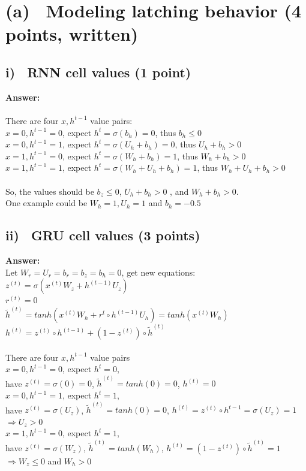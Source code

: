 \documentclass[fleqn]{MJD}
\newcommand{\subproblem}[2]{\section{(#1)~ #2}}
\newcommand{\subsubproblem}[2]{\subsection{ #1)~ #2}}
\newcommand{\0}{\emptyset}
\begin{document}
\subproblem{a}{ Modeling latching behavior (4 points, written)}
\subsubproblem{i} {RNN cell values (1 point)}
\noindent \textbf{Answer:} \\ \\
\indent There are four $x,h^{t-1}$ value pairs: \\
\indent \indent $x=0, h^{t-1}=0$, expect $h^{t}=\sigma(b_{h})=0$, thus $b_{h} \le 0$ \\
\indent \indent $x=0, h^{t-1}=1$, expect $h^{t}=\sigma(U_{h} + b_{h})=0$, thus $U_{h} + b_{h}>0$ \\
\indent \indent $x=1, h^{t-1}=0$, expect $h^{t}=\sigma(W_{h} + b_{h})=1$, thus $W_{h} + b_{h}>0$ \\
\indent \indent $x=1, h^{t-1}=1$, expect $h^{t}=\sigma(W_{h} + U_{h} + b_{h})=1$, thus $W_{h} + U_{h} + b_{h}>0$ \\ \\
\indent So, the values should be $b_{z} \le 0$, $U_{h} + b_{h}>0$ , and  $W_{h} + b_{h}>0$.  \\
\indent One example could be $W_{h} = 1, U_{h} = 1$ and $b_{h} = -0.5$
\subsubproblem{ii} {GRU cell values (3 points)}
\noindent \textbf{Answer:} \\
\indent Let $W_{r} = U_{r} = b_{r} = b_{z} = b_{h} = 0$, get new equations: \\
\indent \indent $z^{(t)}=\sigma(x^{(t)}W_{z} + h^{(t-1)}U_{z})$\\
\indent \indent $r^{(t)}=0$\\
\indent \indent $\tilde{h}^{(t)}=tanh(x^{(t)}W_{h} + r^{t} \circ h^{(t-1)}U_{h})=tanh(x^{(t)}W_{h})$\\
\indent \indent $h^{(t)}=z^{(t)} \circ  h^{(t-1)} + (1 - z^{(t)}) \circ \tilde{h}^{(t)} $ \\ \\
\indent There are four $x,h^{t-1}$ value pairs \\
\indent \indent $x=0, h^{t-1}=0$, expect $h^{t}=0$, \\
\indent \indent \indent have $z^{(t)}=\sigma(0)=0$, $\tilde{h}^{(t)}=tanh(0)=0$, $h^{(t)}=0$ \\
\indent \indent $x=0, h^{t-1}=1$, expect $h^{t}=1$, \\ 
\indent \indent \indent have  $z^{(t)}=\sigma(U_{z})$, $\tilde{h}^{(t)}=tanh(0)=0$, $h^{(t)}=z^{(t)} \circ h^{t-1} = \sigma(U_{z}) = 1$ \\
\indent \indent \indent $\Rightarrow$$U_{z} > 0$ \\
\indent \indent $x=1, h^{t-1}=0$, expect $h^{t}=1$, \\
\indent \indent \indent have  $z^{(t)}=\sigma(W_{z})$, $\tilde{h}^{(t)}=tanh(W_{h})$, $h^{(t)}=(1-z^{(t)}) \circ  \tilde{h}^{(t)} = 1$ \\
\indent \indent \indent $\Rightarrow$$W_{z} \le 0$ and $W_{h} > 0$ \\
\end{document}

